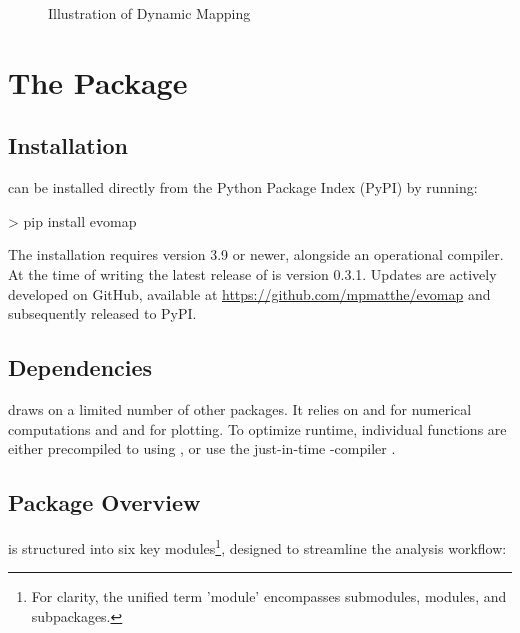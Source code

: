 \documentclass[article]{jss}
\begin{document}
\begin{figure}
  \centering
  \caption{\label{fig:dynamic-map-illustration} Illustration of Dynamic Mapping}
\end{figure}

\section[The evomap Package]{The  Package} \label{sec:package}

\subsection{Installation}

 can be installed directly from the Python Package Index (PyPI) by running:

\begin{CodeChunk}
  \begin{CodeInput}
  > pip install evomap
  \end{CodeInput}
\end{CodeChunk}

The installation requires  version 3.9 or newer, alongside an operational  compiler. 
At the time of writing the latest release of  is version 0.3.1. Updates are actively developed on GitHub, 
available at \href{https://github.com/mpmatthe/evomap}{https://github.com/mpmatthe/evomap} and subsequently released to PyPI.

\subsection{Dependencies}

 draws on a limited number of other packages. It relies on  and  for 
numerical computations and  and  for plotting. To optimize runtime, individual functions 
are either precompiled to  using , or use the just-in-time -compiler .

\subsection{Package Overview}

 is structured into six key modules\footnote{For clarity, the unified term 'module' encompasses 
submodules, modules, and subpackages.}, designed to streamline the analysis workflow:
\end{document}
